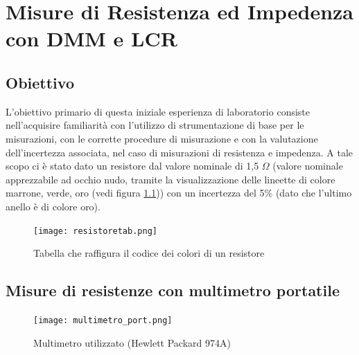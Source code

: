 \chapter{Misure di Resistenza ed Impedenza con DMM e LCR}
\label{chap:prima_prova}


\section*{Obiettivo}
\label{sec:ob_first}

L'obiettivo primario di questa iniziale esperienza di laboratorio consiste nell'acquisire familiarità con l'utilizzo di strumentazione di base per le misurazioni, con le corrette procedure di misurazione e con la valutazione dell'incertezza associata, nel caso di misurazioni di resistenza e impedenza.
\newline \newline
A tale scopo ci è stato dato un resistore dal valore nominale di 1,5 $\Omega$ (valore nominale apprezzabile ad occhio nudo, tramite la visualizzazione delle lineette di colore marrone, verde, oro (vedi figura \ref{fig:resistore})) con un incertezza del 5\% (dato che l'ultimo anello è di colore oro).

\begin{figure}[h]
    \centering
    \texttt{[image: resistoretab.png]}
    \caption{Tabella che raffigura il codice dei colori di un resistore}
    \label{fig:resistore}
\end{figure}
\FloatBarrier











\section{Misure di resistenze con multimetro portatile}
\label{sec:mult_port}

\begin{figure}[h]
    \centering
    \texttt{[image: multimetro\_port.png]}
    \caption{Multimetro utilizzato (Hewlett Packard 974A)}
    \label{fig:multimetro_port}
\end{figure}
\FloatBarrier

